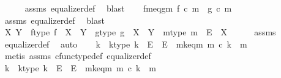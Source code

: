 \begin{isabellebody}
\ \ \ \ \isamarkupfalse%
\ assms{\isacharparenleft}{\kern0pt}{}{\isacharparenright}{\kern0pt}\ equalizer{\isacharunderscore}{\kern0pt}def\ \isamarkupfalse%
\ blast\isanewline
\ \ \isamarkupfalse%
\ fm{\isacharprime}{\kern0pt}{\isacharunderscore}{\kern0pt}eq{\isacharunderscore}{\kern0pt}gm{\isacharprime}{\kern0pt}{\isacharcolon}{\kern0pt}\ {\isachardoublequoteopen}f\ {\isasymcirc}\isactrlsub c\ m{\isacharprime}{\kern0pt}\ {\isacharequal}{\kern0pt}\ g\ {\isasymcirc}\isactrlsub c\ m{\isacharprime}{\kern0pt}{\isachardoublequoteclose}\isanewline
\ \ \ \ \isamarkupfalse%
\ assms{\isacharparenleft}{\kern0pt}{}{\isacharparenright}{\kern0pt}\ equalizer{\isacharunderscore}{\kern0pt}def\ \isamarkupfalse%
\ blast\isanewline
\isanewline
\ \ \isamarkupfalse%
\ X\ Y\ \ f{\isacharunderscore}{\kern0pt}type{\isacharcolon}{\kern0pt}\ {\isachardoublequoteopen}f\ {\isacharcolon}{\kern0pt}\ X\ {\isasymrightarrow}\ Y{\isachardoublequoteclose}\ \ g{\isacharunderscore}{\kern0pt}type{\isacharcolon}{\kern0pt}\ {\isachardoublequoteopen}g\ {\isacharcolon}{\kern0pt}\ X\ {\isasymrightarrow}\ Y{\isachardoublequoteclose}\ \ m{\isacharunderscore}{\kern0pt}type{\isacharcolon}{\kern0pt}\ {\isachardoublequoteopen}m\ {\isacharcolon}{\kern0pt}\ E\ {\isasymrightarrow}\ X{\isachardoublequoteclose}\isanewline
\ \ \ \ \isamarkupfalse%
\ assms{\isacharparenleft}{\kern0pt}{}{\isacharparenright}{\kern0pt}\ \isamarkupfalse%
\ equalizer{\isacharunderscore}{\kern0pt}def\ \isamarkupfalse%
\ auto\isanewline
\isanewline
\ \ \isamarkupfalse%
\ k\ \ k{\isacharunderscore}{\kern0pt}type{\isacharcolon}{\kern0pt}\ {\isachardoublequoteopen}k\ {\isacharcolon}{\kern0pt}\ E{\isacharprime}{\kern0pt}\ {\isasymrightarrow}\ E{\isachardoublequoteclose}\ \ mk{\isacharunderscore}{\kern0pt}eq{\isacharunderscore}{\kern0pt}m{\isacharprime}{\kern0pt}{\isacharcolon}{\kern0pt}\ {\isachardoublequoteopen}m\ {\isasymcirc}\isactrlsub c\ k\ {\isacharequal}{\kern0pt}\ m{\isacharprime}{\kern0pt}{\isachardoublequoteclose}\isanewline
\ \ \ \ \isamarkupfalse%
\ {\isacharparenleft}{\kern0pt}metis\ assms\ cfunc{\isacharunderscore}{\kern0pt}type{\isacharunderscore}{\kern0pt}def\ equalizer{\isacharunderscore}{\kern0pt}def{\isacharparenright}{\kern0pt}\isanewline
\ \ \isamarkupfalse%
\ k{\isacharprime}{\kern0pt}\ \ k{\isacharprime}{\kern0pt}{\isacharunderscore}{\kern0pt}type{\isacharcolon}{\kern0pt}\ {\isachardoublequoteopen}k{\isacharprime}{\kern0pt}\ {\isacharcolon}{\kern0pt}\ E\ {\isasymrightarrow}\ E{\isacharprime}{\kern0pt}{\isachardoublequoteclose}\ \ m{\isacharprime}{\kern0pt}k{\isacharunderscore}{\kern0pt}eq{\isacharunderscore}{\kern0pt}m{\isacharcolon}{\kern0pt}\ {\isachardoublequoteopen}m{\isacharprime}{\kern0pt}\ {\isasymcirc}\isactrlsub c\ k{\isacharprime}{\kern0pt}\ {\isacharequal}{\kern0pt}\ m{\isachardoublequoteclose}\isanewline

\end{isabellebody}

